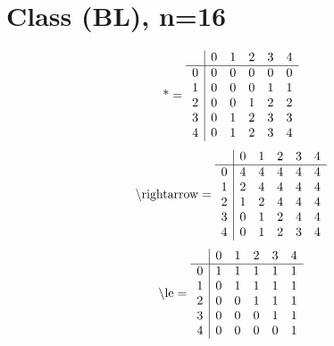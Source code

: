 \documentclass[11pt]{article}
\begin{document}
\section{Class (BL), n=16}
\[\text{*} = 
\begin{array}{r | r r r r r}
 & 0 & 1 & 2 & 3 & 4 \\ \hline
0 & 0 & 0 & 0 & 0 & 0 \\
1 & 0 & 0 & 0 & 1 & 1 \\
2 & 0 & 0 & 1 & 2 & 2 \\
3 & 0 & 1 & 2 & 3 & 3 \\
4 & 0 & 1 & 2 & 3 & 4 \\
\end{array}
\]
\[\text{\textbackslash rightarrow} = 
\begin{array}{r | r r r r r}
 & 0 & 1 & 2 & 3 & 4 \\ \hline
0 & 4 & 4 & 4 & 4 & 4 \\
1 & 2 & 4 & 4 & 4 & 4 \\
2 & 1 & 2 & 4 & 4 & 4 \\
3 & 0 & 1 & 2 & 4 & 4 \\
4 & 0 & 1 & 2 & 3 & 4 \\
\end{array}
\]
\[\text{\textbackslash le} = 
\begin{array}{r | r r r r r}
 & 0 & 1 & 2 & 3 & 4 \\ \hline
0 & 1 & 1 & 1 & 1 & 1 \\
1 & 0 & 1 & 1 & 1 & 1 \\
2 & 0 & 0 & 1 & 1 & 1 \\
3 & 0 & 0 & 0 & 1 & 1 \\
4 & 0 & 0 & 0 & 0 & 1 \\
\end{array}
\]
\end{document}
